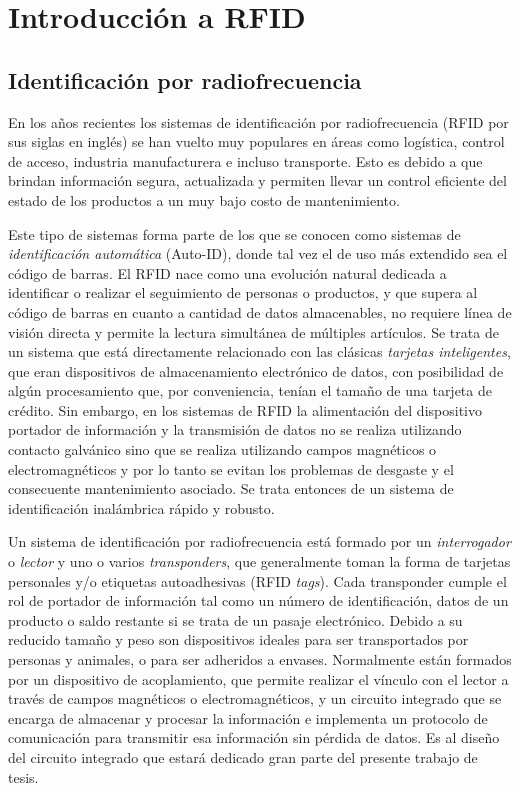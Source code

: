 \chapter{Introducción a RFID}

\section{Identificación por radiofrecuencia}

En los años recientes los sistemas de identificación por radiofrecuencia 
(RFID por sus siglas en inglés) se han vuelto muy populares en áreas como 
logística, control de acceso, industria manufacturera e incluso transporte. 
Esto es debido a que brindan información segura, actualizada y permiten 
llevar un control eficiente del estado de los productos a un muy bajo costo 
de mantenimiento.

Este tipo de sistemas forma parte de los que se conocen como sistemas de 
\emph{identificación automática} (Auto-ID), donde tal vez el de uso más 
extendido sea el código de barras. El RFID nace como una evolución natural 
dedicada a identificar o realizar el seguimiento de personas o productos, y 
que supera al código de barras en cuanto a cantidad de datos almacenables, 
no requiere línea de visión directa y permite la lectura simultánea de 
múltiples artículos. Se trata de un sistema que está directamente 
relacionado con las clásicas \emph{tarjetas inteligentes}, que eran 
dispositivos de almacenamiento electrónico de datos, con posibilidad de 
algún procesamiento que, por conveniencia, tenían el tamaño de una tarjeta 
de crédito. Sin embargo, en los sistemas de RFID la alimentación del 
dispositivo portador de información y la transmisión de datos no se realiza 
utilizando contacto galvánico sino que se realiza utilizando campos 
magnéticos o electromagnéticos y por lo tanto se evitan los problemas de 
desgaste y el consecuente mantenimiento asociado. Se trata entonces de un 
sistema de identificación inalámbrica rápido y robusto.

Un sistema de identificación por radiofrecuencia está formado por un \emph
{interrogador} o \emph{lector} y uno o varios \emph{transponders}, que 
generalmente toman la forma de tarjetas personales y/o etiquetas 
autoadhesivas (RFID \emph{tags}). Cada transponder cumple el rol de portador 
de información tal como un número de identificación, datos de un producto o 
saldo restante si se trata de un pasaje electrónico. Debido a su reducido 
tamaño y peso son dispositivos ideales para ser transportados por personas y 
animales, o para ser adheridos a envases. Normalmente están formados por un 
dispositivo de acoplamiento, que permite realizar el vínculo con el lector a 
través de campos magnéticos o electromagnéticos, y un circuito integrado que 
se encarga de almacenar y procesar la información e implementa un protocolo 
de comunicación para transmitir esa información sin pérdida de datos. Es al 
diseño del circuito integrado que estará dedicado gran parte del presente 
trabajo de tesis.

